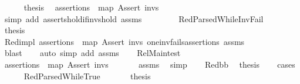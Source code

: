 \begin{isabellebody}
\ \ \ \ \isamarkupfalse%
\ {\isacharquery}{\kern0pt}thesis\ \isamarkupfalse%
\ {\isacartoucheopen}assertions\ {\isacharequal}{\kern0pt}\ {\isacharparenleft}{\kern0pt}map\ Assert\ invs{\isacharparenright}{\kern0pt}{\isacartoucheclose}\isanewline
\ \ \ \ \ \ \isamarkupfalse%
\ {\isacharparenleft}{\kern0pt}simp\ add{\isacharcolon}{\kern0pt}\ asserts{\isacharunderscore}{\kern0pt}hold{\isacharunderscore}{\kern0pt}if{\isacharunderscore}{\kern0pt}invs{\isacharunderscore}{\kern0pt}hold\ assms{\isacharparenleft}{\kern0pt}{}{\isacharparenright}{\kern0pt}{\isacharparenright}{\kern0pt}\isanewline
\ \ \isamarkupfalse%
\isanewline
\ \ \ \ \isamarkupfalse%
\ RedParsedWhile{\isacharunderscore}{\kern0pt}InvFail\ \isanewline
\ \ \ \ \isamarkupfalse%
\ {\isacharquery}{\kern0pt}thesis\ \isanewline
\ \ \ \ \ \ \isamarkupfalse%
\ Red{\isacharunderscore}{\kern0pt}impl\ {\isacartoucheopen}assertions\ {\isacharequal}{\kern0pt}\ map\ Assert\ invs{\isacartoucheclose}\ one{\isacharunderscore}{\kern0pt}inv{\isacharunderscore}{\kern0pt}fails{\isacharunderscore}{\kern0pt}assertions\ assms{\isacharparenleft}{\kern0pt}{}{\isacharparenright}{\kern0pt}\ \isanewline
\ \ \ \ \ \ \isamarkupfalse%
\ blast\isanewline
\ \ \isamarkupfalse%
\ {\isacharparenleft}{\kern0pt}auto\ simp\ add{\isacharcolon}{\kern0pt}\ assms{\isacharparenleft}{\kern0pt}{}{\isacharparenright}{\kern0pt}{\isacharparenright}{\kern0pt}\isanewline
{}\isamarkupfalse%
\isanewline
\ \ \isamarkupfalse%
\ Rel{\isacharunderscore}{\kern0pt}Main{\isacharunderscore}{\kern0pt}test\isanewline
\ \ \isamarkupfalse%
\ {\isachardoublequoteopen}assertions\ {\isacharequal}{\kern0pt}\ map\ Assert\ invs{\isachardoublequoteclose}\ \isanewline
\ \ \ \ \isamarkupfalse%
\ assms{\isacharparenleft}{\kern0pt}{}{\isacharminus}{\kern0pt}{}{\isacharparenright}{\kern0pt}\ \isamarkupfalse%
\ simp\isanewline
\ \ \isamarkupfalse%
\ Red{\isacharunderscore}{\kern0pt}bb\ \isamarkupfalse%
\ {\isacharquery}{\kern0pt}thesis\isanewline
\ \ \isamarkupfalse%
\ cases\isanewline
\ \ \ \ \isamarkupfalse%
\ RedParsedWhileTrue\ \isanewline
\ \ \ \ \isamarkupfalse%
\ {\isacharquery}{\kern0pt}thesis\ \isamarkupfalse%

\end{isabellebody}
